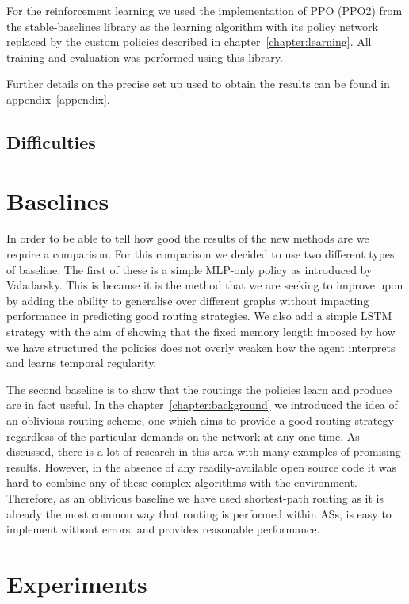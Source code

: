 For the reinforcement learning we used the implementation of PPO (PPO2) from the stable-baselines\cite{stable-baselines} library as the learning algorithm with its policy network replaced by the custom policies described in chapter~\ref{chapter:learning}. All training and evaluation was performed using this library.

Further details on the precise set up used to obtain the results can be found in appendix~\ref{appendix}.

\subsection{Difficulties}

\section{Baselines}
In order to be able to tell how good the results of the new methods are we require a comparison. For this comparison we decided to use two different types of baseline. The first of these is a simple MLP-only policy as introduced by Valadarsky. This is because it is the method that we are seeking to improve upon by adding the ability to generalise over different graphs without impacting performance in predicting good routing strategies. We also add a simple LSTM strategy with the aim of showing that the fixed memory length imposed by how we have structured the policies does not overly weaken how the agent interprets and learns temporal regularity.

The second baseline is to show that the routings the policies learn and produce are in fact useful. In the chapter~\ref{chapter:background} we introduced the idea of an oblivious routing scheme, one which aims to provide a good routing strategy regardless of the particular demands on the network at any one time. As discussed, there is a lot of research in this area with many examples of promising results. However, in the absence of any readily-available open source code it was hard to combine any of these complex algorithms with the environment. Therefore, as an oblivious baseline we have used shortest-path routing as it is already the most common way that routing is performed within ASs, is easy to implement without errors, and provides reasonable performance.

\section{Experiments}

